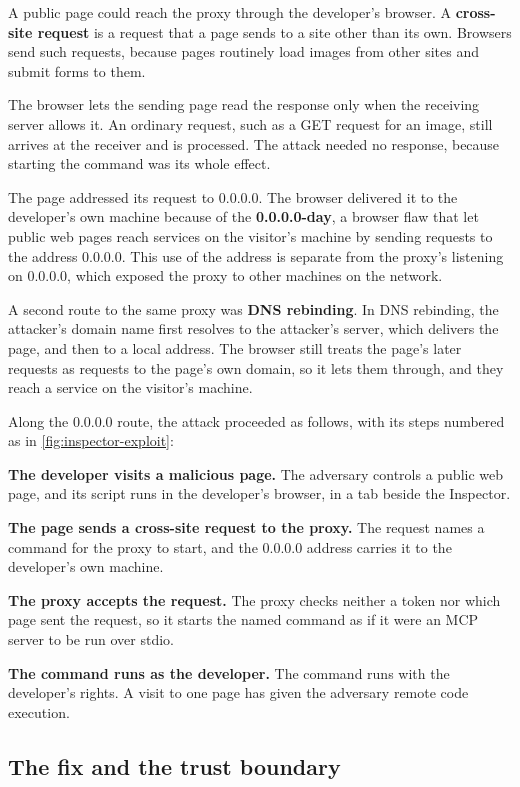 A public page could reach the proxy through the developer's browser. A \textbf{cross-site request}
is a request that a page sends to a site other than its own. Browsers send such requests, because
pages routinely load images from other sites and submit forms to them.

The browser lets the sending page read the response only when the receiving server allows it. An
ordinary request, such as a GET request for an image, still arrives at the receiver and is
processed. The attack needed no response, because starting the command was its whole effect.

The page addressed its request to 0.0.0.0. The browser delivered it to the developer's own machine
because of the \textbf{0.0.0.0-day}, a browser flaw that let public web pages reach services on the
visitor's machine by sending requests to the address 0.0.0.0. This use of the address is separate
from the proxy's listening on 0.0.0.0, which exposed the proxy to other machines on the network.

A second route to the same proxy was \textbf{DNS rebinding}. In DNS rebinding, the attacker's domain
name first resolves to the attacker's server, which delivers the page, and then to a local address.
The browser still treats the page's later requests as requests to the page's own domain, so it lets
them through, and they reach a service on the visitor's machine.

Along the 0.0.0.0 route, the attack proceeded as follows, with its steps numbered as in
\cref{fig:inspector-exploit}:
\be
\item \textbf{The developer visits a malicious page.} The adversary controls a public web page, and
its script runs in the developer's browser, in a tab beside the Inspector.
\item \textbf{The page sends a cross-site request to the proxy.} The request names a command for
the proxy to start, and the 0.0.0.0 address carries it to the developer's own machine.
\item \textbf{The proxy accepts the request.} The proxy checks neither a token nor which page sent
the request, so it starts the named command as if it were an MCP server to be run over stdio.
\item \textbf{The command runs as the developer.} The command runs with the developer's rights. A
visit to one page has given the adversary remote code execution.
\ee

\subsection{The fix and the trust boundary}
\label{sec:inspector-fix}

